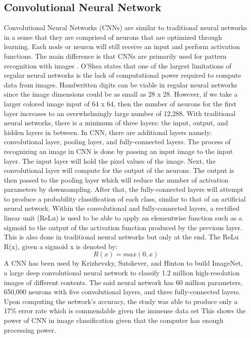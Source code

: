 \documentclass[journal]{./IEEE/IEEEtran}
\begin{document}
\subsection{Convolutional Neural Network}
Convolutional Neural Networks (CNNs) are similar to traditional neural networks in a sense that they are comprised of neurons that are optimized through learning. Each node or neuron will still receive an input and perform activation functions. The main difference is that CNNs are primarily used for pattern recognition with images \cite{OShea2015}.
\newline
\indent O'Shea \cite{OShea2015} states that one of the largest limitations of regular neural networks is the lack of computational power required to compute data from images. Handwritten digits can be viable in regular neural networks since the image dimensions could be as small as 28 x 28. However, if we take a larger colored image input of 64 x 64, then the number of neurons for the first layer increases to an overwhelmingly large number of 12,288.
\newline 
\indent With traditional neural networks, there is a minimum of three layers: the input, output, and hidden layers in between. In CNN, there are additional layers namely: convolutional layer, pooling layer, and fully-connected layers. The process of recognizing an image in CNN is done by passing an input image to the input layer. The input layer will hold the pixel values of the image. Next, the convolutional layer will compute for the output of the neurons. The output is then passed to the pooling layer which will reduce the number of activation parameters by downsampling. After that, the fully-connected layers will attempt to produce a probability classification of each class, similar to that of an artificial neural network.
\newline
\indent Within the convolutional and fully-connected layers, a rectified linear unit (ReLu) is used to be able to apply an elementwise function such as a sigmoid to the output of the activation function produced by the previous layer. This is also done in traditional neural networks but only at the end. The ReLu R(x), given a sigmoid x is denoted by:
\newline
\begin{equation}
R(x) = max(0,x)
\end{equation}
\newline
\indent A CNN has been used by Krizhevsky, Sutskever, and Hinton \cite{Krizhevsky2012} to build ImageNet, a large deep convolutional neural network to classify 1.2 million high-resolution images of different contents. The said neural network has 60 million parameters, 650,000 neurons with five convolutional layers, and three fully-connected layers. Upon computing the network's accuracy, the study was able to produce only a 17\% error rate which is commendable given the immense data set  This shows the power of CNN in image classification given that the computer has enough processing power.
\end{document}
